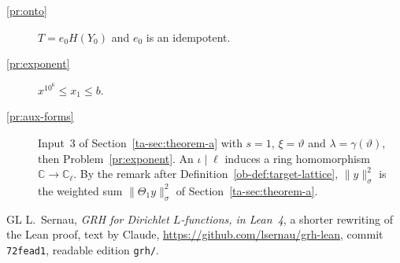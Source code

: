 \documentclass[reqno]{amsart}
\theoremstyle{definition}
\theoremstyle{plain}
\newcommand{\C}{\mathbb C}
\begin{document}
\begin{description}
\item[\ref{pr:onto}] \(T = e_0H(Y_0)\) and \(e_0\) is an idempotent.
\item[\ref{pr:exponent}] \(x^{10^6} \le x_1 \le b\).
\item[\ref{pr:aux-forms}] Input~3 of Section~\ref{ta-sec:theorem-a} with \(s = 1\), \(\xi = \vartheta\) and \(\lambda = \gamma(\vartheta)\), then Problem~\ref{pr:exponent}.  An \(\iota \mid \ell\) induces a ring homomorphism \(\C \to \C_\ell\).  By the remark after Definition~\ref{ob-def:target-lattice}, \(\lVert y\rVert_\sigma^2\) is the weighted sum \(\lVert\Theta_1 y\rVert_\sigma^2\) of Section~\ref{ta-sec:theorem-a}.
\end{description}

\begin{thebibliography}{GL}
 L.~Sernau, \emph{GRH for Dirichlet \(L\)-functions, in Lean~4}, a shorter rewriting of the Lean proof, text by Claude, \url{https://github.com/lsernau/grh-lean}, commit \texttt{72fead1}, readable edition \texttt{grh/}.
\end{thebibliography}
\end{document}
